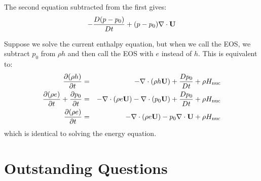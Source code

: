 The second equation subtracted from the first gives:
\begin{equation}
  -\frac{D (p - p_0)}{Dt} + (p - p_0)  \nabla \cdot {\bf U}
\end{equation}

Suppose we solve the current enthalpy equation, but when we call the EOS, we 
subtract $p_0$ from $\rho h$ and then call the EOS with $e$ instead of $h$.  This is equivalent
to:
\begin{eqnarray}
\frac{\partial(\rho h)}{\partial t} &=& -\nabla\cdot(\rho h\Ub) +
  \frac{Dp_0}{Dt} + \rho\Hnuc \nonumber \\
%
\frac{\partial(\rho e)}{\partial t} + \frac{\partial p_0}{\partial t} &=&
 -\nabla\cdot(\rho e\Ub) -\nabla\cdot(p_0 \Ub) + \frac{Dp_0}{Dt} + \rho\Hnuc \nonumber \\
%
\frac{\partial(\rho e)}{\partial t} &=&
 -\nabla\cdot(\rho e\Ub) - p_0 \nabla\cdot\Ub + \rho\Hnuc  \nonumber
\end{eqnarray}
which is identical to solving the energy equation.

\section{Outstanding Questions}

